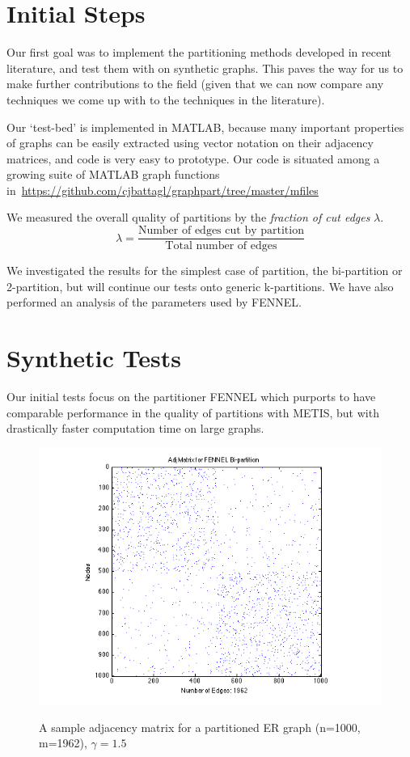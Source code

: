 \documentclass[11pt]{article}
\begin{document}
\section{Initial Steps}
Our first goal was to implement the partitioning methods developed in recent literature, and test them with on synthetic graphs. This paves the way for us to make further contributions to the field (given that we can now compare any techniques we come up with to the techniques in the literature).

Our `test-bed' is implemented in MATLAB, because many important properties of graphs can be easily extracted using vector notation on their adjacency matrices, and code is very easy to prototype. Our code is situated among a growing suite of MATLAB graph functions in~\url{https://github.com/cjbattagl/graphpart/tree/master/mfiles}

We measured the overall quality of partitions by the \textit{fraction of cut edges} $\lambda$.
\[\lambda = \frac{\text{Number of edges cut by partition}}{\text{Total number of edges}}\]

We investigated the results for the simplest case of partition, the bi-partition or 2-partition, but will continue our tests onto generic k-partitions.  
We have also performed an analysis of the parameters used by FENNEL.

\section*{Synthetic Tests} \vspace{-10 pt}
Our initial tests focus on the partitioner FENNEL which purports to have comparable performance in the quality of partitions with METIS, but with drastically faster computation time on large graphs. 

\begin{figure}[ht]
\centering
\caption{A sample adjacency matrix for a partitioned ER graph (n=1000, m=1962), $\gamma = 1.5$}
\includegraphics[scale=.65] {figures/adj_spy.png}
\label{fig:1}
\end{figure}
\end{document}
